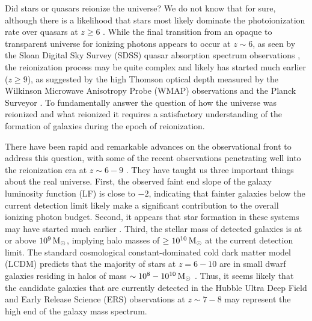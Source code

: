 Did stars or quasars reionize the universe?
We do not know that for sure, although there is a likelihood
that stars most likely dominate the photoionization rate over quasars at $z\ge 6$
\citep[e.g.,][]{2008FG}.
While the final transition from an opaque to transparent universe for ionizing photons
appears to occur
at $z\sim 6$, as seen by the Sloan Digital Sky Survey (SDSS) quasar absorption spectrum observations \citep[e.g.,][]{2006Fan}, 
the reionization process may be quite complex and likely has started much earlier ($z\ge 9$),
as suggested by the high Thomson optical depth measured by 
the Wilkinson Microwave Anisotropy Probe (WMAP) observations \citep[e.g.,][]{2012Hinshaw}
and the Planck Surveyor \citep[e.g.,][]{2013Planck}.
To fundamentally answer the question of how the universe was reionized 
and what reionized it
requires a satisfactory understanding of the formation of galaxies during the epoch of reionization.

There have been rapid and remarkable advances on the observational front
to address this question, with some of the recent observations penetrating well into
the reionization era at $z\sim 6-9$ \citep[e.g.,][]{2010eBouwens,2010Bunker,2010Yan, 2010Stark, 2010Labbe, 2011Wilkins, 2011Mclure, 2012Dunlop, 2012aBouwens, 2012Finkelstein, 2013Dunlop}.
They have taught us three important things about the real universe.
First, the observed faint end slope of the galaxy luminosity function (LF) is close to $-2$,
indicating that fainter galaxies below the current detection limit 
likely make a significant contribution to the overall ionizing photon budget.
Second, it appears that star formation in these systems may have started much earlier \citep[][]{2010Labbe}.
Third, the stellar mass of detected galaxies is at or above $10^{9}{\rm\,M_\odot}$,
implying halo masses of $\ge 10^{10}{\rm\,M_\odot}$ at the current detection limit.
The standard cosmological constant-dominated cold dark matter model (LCDM) \citep[e.g.,][]{1995Krauss} 
predicts that the majority of stars at $z=6-10$ are in small dwarf galaxies residing in halos 
of mass $\sim 10^{8}-10^{10}{\rm\,M_\odot}$ \citep[e.g.,][]{2009Wise}.
Thus, it seems likely that the candidate galaxies that are currently detected in the Hubble Ultra Deep Field
and Early Release Science (ERS) observations at $z\sim 7-8$ 
may represent the high end of the galaxy mass spectrum.

